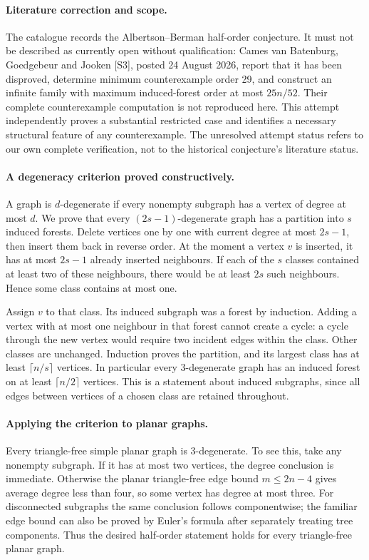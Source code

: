 \documentclass[11pt,a4paper]{article}
\begin{document}
\paragraph{Literature correction and scope.}
The catalogue records the Albertson--Berman half-order conjecture. It must not be described as currently open without qualification: Cames van Batenburg, Goedgebeur and Jooken [S3], posted 24 August 2026, report that it has been disproved, determine minimum counterexample order 29, and construct an infinite family with maximum induced-forest order at most $25n/52$. Their complete counterexample computation is not reproduced here. This attempt independently proves a substantial restricted case and identifies a necessary structural feature of any counterexample. The unresolved attempt status refers to our own complete verification, not to the historical conjecture's literature status.

\paragraph{A degeneracy criterion proved constructively.}
A graph is $d$-degenerate if every nonempty subgraph has a vertex of degree at most $d$. We prove that every $(2s-1)$-degenerate graph has a partition into $s$ induced forests. Delete vertices one by one with current degree at most $2s-1$, then insert them back in reverse order. At the moment a vertex $v$ is inserted, it has at most $2s-1$ already inserted neighbours. If each of the $s$ classes contained at least two of these neighbours, there would be at least $2s$ such neighbours. Hence some class contains at most one.

Assign $v$ to that class. Its induced subgraph was a forest by induction. Adding a vertex with at most one neighbour in that forest cannot create a cycle: a cycle through the new vertex would require two incident edges within the class. Other classes are unchanged. Induction proves the partition, and its largest class has at least $\lceil n/s\rceil$ vertices. In particular every 3-degenerate graph has an induced forest on at least $\lceil n/2\rceil$ vertices. This is a statement about induced subgraphs, since all edges between vertices of a chosen class are retained throughout.

\paragraph{Applying the criterion to planar graphs.}
Every triangle-free simple planar graph is 3-degenerate. To see this, take any nonempty subgraph. If it has at most two vertices, the degree conclusion is immediate. Otherwise the planar triangle-free edge bound $m\le2n-4$ gives average degree less than four, so some vertex has degree at most three. For disconnected subgraphs the same conclusion follows componentwise; the familiar edge bound can also be proved by Euler's formula after separately treating tree components. Thus the desired half-order statement holds for every triangle-free planar graph.
\end{document}
